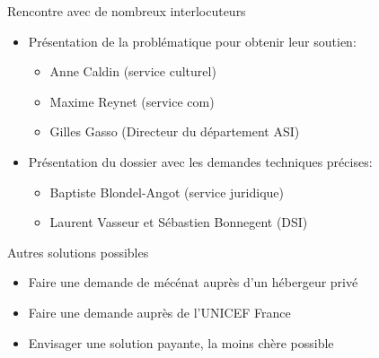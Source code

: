 \begin{frame}
	\begin{block}{Rencontre avec de nombreux interlocuteurs}
	\begin{itemize}
    	\item Présentation de la problématique pour obtenir leur soutien:
		\begin{itemize}
			\item Anne Caldin (service culturel)
			\item Maxime Reynet (service com)
			\item Gilles Gasso (Directeur du département ASI)
		\end{itemize}
		\item Présentation du dossier avec les demandes techniques précises:
		\begin{itemize}
			\item Baptiste Blondel-Angot (service juridique)
			\item Laurent Vasseur et Sébastien Bonnegent (DSI)
		\end{itemize}    
	\end{itemize}
	\end{block}
\end{frame}

\begin{frame}
	\begin{block}{Autres solutions possibles}
      \begin{itemize}
        \item Faire une demande de mécénat auprès d'un hébergeur privé
        \item Faire une demande auprès de l'UNICEF France
        \item Envisager une solution payante, la moins chère possible
      \end{itemize}
    \end{block}
\end{frame}

